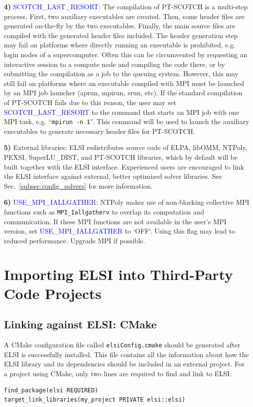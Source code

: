 \documentclass{report}
\newcommand{\tcb}[1]{\textcolor{blue}{#1}}
\begin{document}
\textbf{4)} \tcb{SCOTCH\_LAST\_RESORT}: The compilation of PT-SCOTCH is a multi-step process. First, two auxiliary executables are created. Then, some header files are generated on-the-fly by the two executables. Finally, the main source files are compiled with the generated header files included. The header generation step may fail on platforms where directly running an executable is prohibited, e.g. login nodes of a supercomputer. Often this can be circumvented by requesting an interactive session to a compute node and compiling the code there, or by submitting the compilation as a job to the queuing system. However, this may still fail on platforms where an executable compiled with MPI must be launched by an MPI job launcher (aprun, mpirun, srun, etc). If the standard compilation of PT-SCOTCH fails due to this reason, the user may set \tcb{SCOTCH\_LAST\_RESORT} to the command that starts an MPI job with one MPI task, e.g. ``\verb+mpirun -n 1+''. This command will be used to launch the auxiliary executables to generate necessary header files for PT-SCOTCH.

\textbf{5)} External libraries: ELSI redistributes source code of ELPA, libOMM, NTPoly, PEXSI, SuperLU\_DIST, and PT-SCOTCH libraries, which by default will be built together with the ELSI interface. Experienced users are encouraged to link the ELSI interface against external, better optimized solver libraries. See Sec.~\ref{subsec:config_solvers} for more information.

\textbf{6)} \tcb{USE\_MPI\_IALLGATHER}: NTPoly makes use of non-blocking collective MPI functions such as \texttt{MPI\_Iallgatherv} to overlap its computation and communication. If these MPI functions are not available in the user's MPI version, set \tcb{USE\_MPI\_IALLGATHER} to `OFF`. Using this flag may lead to reduced performance. Upgrade MPI if possible.

\section{Importing ELSI into Third-Party Code Projects}
\label{sec:import}
\subsection{Linking against ELSI: CMake}
\label{subsec:import_cmake}
A CMake configuration file called \texttt{elsiConfig.cmake} should be generated after ELSI is successfully installed. This file contains all the information about how the ELSI library and its dependencies should be included in an external project. For a project using CMake, only two lines are required to find and link to ELSI:
\begin{tcolorbox}
\begin{verbatim}
find_package(elsi REQUIRED)
target_link_libraries(my_project PRIVATE elsi::elsi)
\end{verbatim}
\end{tcolorbox}
\end{document}
